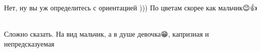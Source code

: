  
 
 
 
 

\qqSecCmt


Нет, ну вы уж определитесь с ориентацией ))) По цветам скорее как мальчик😉👍🌸

\begin{itemize} %

Сложно сказать. На вид мальчик, а в душе девочка😁, капризная и непредсказуемая
\end{itemize} %
